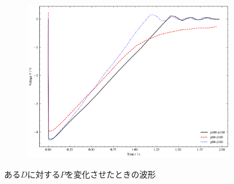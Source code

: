 \begin{figure}
\begin{subfigure}{0.48\columnwidth}
	\end{subfigure}
	\begin{subfigure}{0.48\columnwidth}
		\centering
		\includegraphics[width=0.8\linewidth]{src/figures/oscilloscope-grouped/d-100.png}
	\end{subfigure}
	\caption{ある$D$に対する$P$を変化させたときの波形}\label{fig:oscilloscope-grouped-d}
\end{figure}


